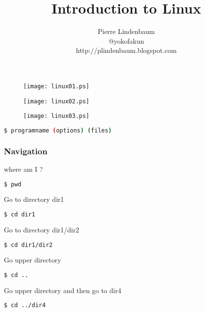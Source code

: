 \documentclass{beamer}
\title{Introduction to Linux}
\author{Pierre Lindenbaum\\@yokofakun\\http://plindenbaum.blogspot.com}\institute{Institut du Thorax. Nantes. France}
\begin{document}
\begin{frame}
\titlepage
\end{frame}



\begin{frame}
\begin{figure}
\texttt{[image: linux01.ps]}
\end{figure}
\end{frame}

\begin{frame}
\begin{figure}
\texttt{[image: linux02.ps]}
\end{figure}
\end{frame}

\begin{frame}
\begin{figure}
\texttt{[image: linux03.ps]}
\end{figure}
\end{frame}


\begin{frame}[fragile]
\begin{lstlisting}[language=bash]
$ programname (options) (files)
\end{lstlisting}
\end{frame}

\begin{frame}[fragile]
\frametitle{Navigation}

where am I ?
\begin{lstlisting}[language=bash]
$ pwd
\end{lstlisting}

Go to directory dir1
\begin{lstlisting}[language=bash]
$ cd dir1
\end{lstlisting}

Go to directory dir1/dir2
\begin{lstlisting}[language=bash]
$ cd dir1/dir2
\end{lstlisting}


Go upper directory
\begin{lstlisting}[language=bash]
$ cd ..
\end{lstlisting}

Go upper directory and then go to dir4
\begin{lstlisting}[language=bash]
$ cd ../dir4
\end{lstlisting}


\end{frame}
\end{document}
